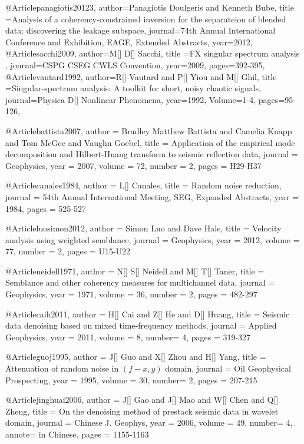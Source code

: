 @Article{panagiotis20123,
  author={Panagiotis Doulgeris and Kenneth Bube},
  title ={Analysis of a coherency-constrained inversion for the separateion of blended data: discovering the leakage subspace},
  journal={74th Annual International Conference and Exhibition, EAGE, Extended Abstracts},
  year=2012,
  }
@Article{sacchi2009,
  author={M[] D[] Sacchi},
  title ={{FX} singular spectrum analysis },
  journal={CSPG CSEG CWLS Convention},
  year=2009,
  pages={392-395},
}
@Article{vautard1992,
  author={R[] Vautard and P[] Yiou and M[] Ghil},
  title ={Singular-spectrum analysis: A toolkit for short, noisy chaotic signals},
  journal={Physica D[] Nonlinear Phenomena},
  year=1992,
  Volume=1-4,
  pages={95-126},
}

@Article{battista2007,
  author = 	 {Bradley Matthew Battista and Camelia Knapp and Tom McGee and Vaughn Goebel},
  title = 	 {Application of the empirical mode decomposition and
{Hilbert-Huang} transform to seismic reflection data},
  journal = 	 {Geophysics},
  year = 	 2007,
  volume = 	 72,
  number = 	 2,
  pages = 	 {H29-H37}}

@Article{canales1984,
  author = 	 {L[] Canales},
  title = 	 {Random noise reduction},
  journal = 	 {54th Annual International Meeting, SEG, Expanded Abstracts},
  year = 	 1984,
  pages =	 {525-527}
}

@Article{luosimon2012,
  author = 	 {Simon Luo and Dave Hale},
  title = 	 {Velocity analysis using weighted semblance},
  journal = 	 {Geophysics},
  year = 	 2012,
  volume = 	 77,
  number = 	 2,
  pages = 	 {U15-U22}}


@Article{neidell1971,
  author = 	 {N[] S[] Neidell and M[] T[] Taner},
  title = 	 {Semblance and other coherency measures for multichannel data},
  journal = 	 {Geophysics},
  year = 	 1971,
  volume = 	 36,
  number = 	 2,
  pages = 	 {482-297}}


@Article{caih2011,
  author = 	 {H[] Cai and Z[] He and D[] Huang},
  title = 	 {Seismic data denoising based on mixed time-frequency methods},
  journal = 	 {Applied Geophysics},
  year = 	 2011,
  volume =	 8,
  number= 	 4,
  pages =	 {319-327}
}

@Article{guoj1995,
  author = 	 {J[] Guo and X[] Zhou and H[] Yang},
  title = 	 {Attenuation of random noise in $(f-x,y)$ domain},
  journal = 	 {Oil Geophysical Prospecting},
  year = 	 1995,
  volume =	 30,
  number=        2,
  pages =	 {207-215}
}

@Article{jinghuai2006,
  author = 	 {J[] Gao and J[] Mao and W[] Chen and Q[] Zheng},
  title = 	 {On the denoising method of prestack seismic data in wavelet domain},
  journal = 	 {Chinese J. Geophys},
  year = 	 2006,
  volume =	 49,
  number= 	 4,
  annote=        {in Chinese},
  pages =	 {1155-1163}
}

